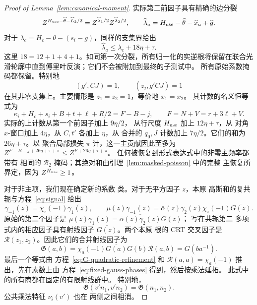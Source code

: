 \documentclass[11pt,a4paper]{article}
\numberwithin{equation}{section}
\numberwithin{figure}{section}
\theoremstyle{definition}
\theoremstyle{remark}
\begin{document}
\begin{proof}[Proof of Lemma~\ref{lem:canonical-moment}]
实际第二前因子具有精确的边分裂
\[
 Z^{H_{\rm use}-\widehat\theta-\widehat L_2/2}
       =Z^{\widehat\lambda_1/2}Z^{\widehat\lambda_2/2},
 \qquad \widehat\lambda_a=H_{\rm use}-\widehat\theta-\widehat x_a+
                           \widehat g.
\]
对于 \(\lambda_c=H_c-\theta-(s_i-g)\)，同样的支集界给出
\begin{equation}\label{eq:inverse-second-prefactor-error}
 \widehat\lambda_a\le\lambda_c+18\eta+\tau.
\end{equation}
这里 \(18=12+1+4+1\)。如同第一次分裂，所有归一化的实逆根将保留在联合光滑轮廓中直到傅里叶反演；它们不会被附加到最终的子测试中。
所有原始系数掩码都保留。特别地
\[
 (g',CJ)=1,\qquad (z_j,g'CJ)=1
\]
在其非零支集上。主要情形是 \(z_1=z_2=1\)，等价地 \(x_1=x_2\)。
其计数的名义恒等式为
\begin{equation}\label{eq:second-principal-exponent}
 \kappa_i+H_c+s_i+B+t+\ell+R/2=F-B-j,
 \qquad F=N+V=r+3\ell+V.
\end{equation}
实际的上计数从第一个前因子加上 \(9\eta/2\)，
从行尺度 \(H_{\rm use}\) 加上 \(12\eta+\tau\)，从
对角 \(x\)-窗口加上 \(4\eta\)，从 \(C,t'\) 各加上 \(\eta\)，从
合并的 \(q_0,J\) 计数加上 \(7\eta/2\)。它们的和为 \(26\eta+\tau\)。以
聚合局部损失 \(\pi\) 计，这一主贡献因此至多为
\(Z^{F-B-j+26\eta+\tau+\pi}\le Z^{F+26\eta+\tau+\pi}\)。
任何被恢复到形式表达式中的非零主频率都带有
相同的 \(\mathcal B_2\) 掩码；其绝对和由引理~\ref{lem:masked-poisson} 中的完整
主恢复所界定，因为
\(Z^{H_{\rm use}}\ge1\)。

对于非主项，我们现在确定新的系数
类。对于无平方因子 \(z\)，本原
高斯和的复共轭与方程~\eqref{eq:signal} 给出
\[
 \gamma_{-1}(z)=\chi_z(-1)\overline{\gamma_1(z)},\qquad
 \mu(z)\gamma_{-1}(z)
 =\bar\alpha(z)\gamma_2(z)\chi_z(-1)\overline{G(z)}.
\]
原始的第二个因子是
\(\mu(z)\gamma_1(z)=\overline{\bar\alpha(z)\gamma_2(z)}G(z)\)；
写在共轭第二
多项式内的相应因子具有射线因子 \(\overline{G(z)}\)。两个本原
根的 CRT 交叉因子是 \(\mathcal R(z_1,z_2)\)。因此它们的合并射线因子为
\[
 \mathfrak G(a,b)=\chi_a(-1)\overline{G(a)}G(b)\mathcal R(a,b)
       =G(ba^{-1}).
\]
最后一个等式由
方程~\eqref{eq:G-quadratic-refinement} 和
\(\mathcal R(a,a)=\chi_a(-1)\) 推出，先在素数上由
方程~\eqref{eq:fixed-gauss-phases} 得到，然后按乘法延拓。
此式中的所有商都在固定的有限射线群中。
特别地，
\[
 \mathfrak G(v'n_1,v'n_2)=\mathfrak G(n_1,n_2).
\]
公共乘法特征 \(\nu_i(v')\) 也在
两侧之间相消。


\end{proof}
\end{document}
